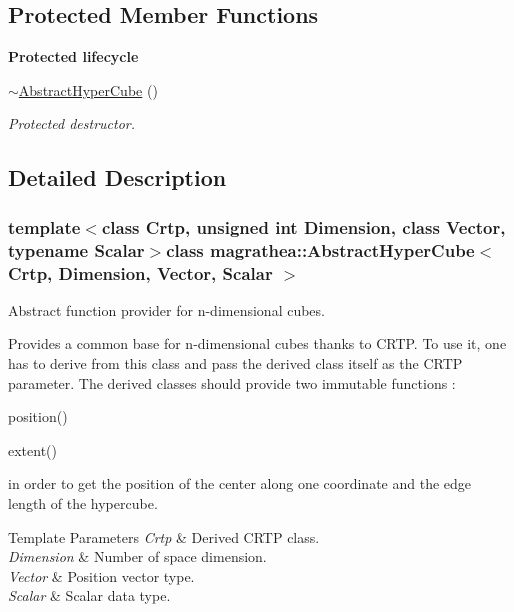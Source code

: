 \subsection*{Protected Member Functions}
\begin{Indent}{\bf Protected lifecycle}\par
\begin{DoxyCompactItemize}
\item 
\hyperlink{classmagrathea_1_1AbstractHyperCube_a1d8df066cb99cde45bdc3707120c3d8c}{$\sim$\-Abstract\-Hyper\-Cube} ()
\begin{DoxyCompactList}\small\item\em Protected destructor. \end{DoxyCompactList}\end{DoxyCompactItemize}
\end{Indent}


\subsection{Detailed Description}
\subsubsection*{template$<$class Crtp, unsigned int Dimension, class Vector, typename Scalar$>$class magrathea\-::\-Abstract\-Hyper\-Cube$<$ Crtp, Dimension, Vector, Scalar $>$}

Abstract function provider for n-\/dimensional cubes. 

Provides a common base for n-\/dimensional cubes thanks to C\-R\-T\-P. To use it, one has to derive from this class and pass the derived class itself as the C\-R\-T\-P parameter. The derived classes should provide two immutable functions \-: 
\begin{DoxyItemize}
\item position() 
\item extent()
\end{DoxyItemize}in order to get the position of the center along one coordinate and the edge length of the hypercube. 
\begin{DoxyTemplParams}{Template Parameters}
{\em Crtp} & Derived C\-R\-T\-P class. \\
\hline
{\em Dimension} & Number of space dimension. \\
\hline
{\em Vector} & Position vector type. \\
\hline
{\em Scalar} & Scalar data type. \\
\hline
\end{DoxyTemplParams}


